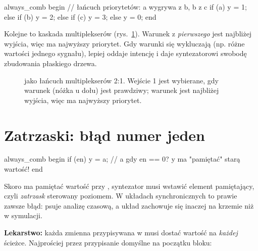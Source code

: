 \begin{sv}
always_comb begin            // łańcuch priorytetów: a wygrywa z b, b z c
  if (a)      y = 1;
  else if (b) y = 2;
  else if (c) y = 3;
  else        y = 0;
end
\end{sv}

Kolejne  to kaskada multiplekserów (rys.~\ref{fig:prio}).
Warunek z \emph{pierwszego}  jest najbliżej wyjścia, więc ma najwyższy
priorytet. Gdy warunki się wykluczają (np. różne wartości jednego sygnału),
 lepiej oddaje intencję i daje syntezatorowi swobodę zbudowania
płaskiego drzewa.

\begin{figure}[h]
\centering
{}
\caption{ jako łańcuch multiplekserów 2:1. Wejście 1 jest wybierane, gdy warunek (nóżka u dołu) jest prawdziwy; warunek  jest najbliżej wyjścia, więc ma najwyższy priorytet.}
\label{fig:prio}
\end{figure}

\section{Zatrzaski: błąd numer jeden}

\begin{sv}
always_comb begin
  if (en) y = a;    // a gdy en == 0? y ma "pamiętać" starą wartość!
end
\end{sv}

Skoro  ma pamiętać wartość przy , syntezator musi wstawić
element pamiętający, czyli \emph{zatrzask} sterowany poziomem. W układach
synchronicznych to prawie zawsze błąd: psuje analizę czasową, a układ zachowuje
się inaczej na krzemie niż w symulacji.

\textbf{Lekarstwo:} każda zmienna przypisywana w  musi dostać
wartość na \emph{każdej} ścieżce. Najprościej przez przypisanie domyślne na
początku bloku:

